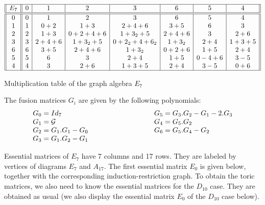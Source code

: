 \documentclass[a4paper,11pt]{article}
\begin{document}
\begin{table}[hhh]
$$
\begin{array}{||c||c|c|c|c|c|c|c||}
\hline
E_7& 0 & 1  & 2 & 3 & 6 & 5 & 4  \\
\hline
\hline
0 & 0 & 1     & 2       & 3           & 6     & 5     & 4     \\
1 & 1 & 0+2   & 1+3     & 2+4+6       & 3+5   & 6     & 3     \\
2 & 2 & 1+3   & 0+2+4+6 & 1+3_2+5     & 2+4+6 & 3     & 2+6   \\
3 & 3 & 2+4+6 & 1+3_2+5 & 0+2_2+4+6_2 & 1+3_2 & 2+4   & 1+3+5 \\
6 & 6 & 3+5   & 2+4+6   & 1+3_2       & 0+2+6 & 1+5   & 2+4   \\
5 & 5 & 6     & 3       & 2+4         & 1+5   & 0-4+6 & 3-5   \\
4 & 4 & 3     & 2+6     & 1+3+5       & 2+4   & 3-5   & 0+6   \\
\hline
\end{array}
$$
\caption{Multiplication table of the graph algebra $E_7$}
\end{table}
The fusion matrices $G_{i}$ are given by the following polynomials:
$$
\begin{array}{ll}
G_0 = Id_7  \qquad \qquad \qquad \qquad \qquad \qquad &
G_5 = G_3.G_2 - G_1 - 2.G_3 \\
G_1 = \cal{G} &
G_4 = G_5.G_2 \\
G_2 = G_1.G_1 - G_0 &
G_6 = G_5.G_4 - G_2 \\
G_3 = G_1.G_2 - G_1 & {}
\end{array}
$$

Essential matrices of $E_{7}$ have 7 columns and 17 rows. They are labeled
by vertices of diagrams $E_7$ and $A_{17}$. The first essential
matrix $E_0$ is given below, together with the corresponding
induction-restriction graph. To obtain the toric matrices, we also
need to know the essential matrices for the $D_{10}$ case. They are
obtained as usual (we also display
the essential matrix $E_0$ of the $D_{10}$ case below).
\end{document}
